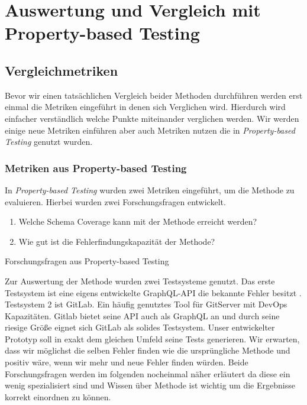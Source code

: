 \chapter{Auswertung und Vergleich mit Property-based Testing}
\label{experimente}

\section{Vergleichmetriken}
Bevor wir einen tatsächlichen Vergleich beider Methoden durchführen werden erst einmal die Metriken eingeführt in denen
sich Verglichen wird.
Hierdurch wird einfacher verständlich welche Punkte miteinander verglichen werden.
Wir werden einige neue Metriken einführen aber auch Metriken nutzen die in \textit{Property-based Testing}\cite{property-based-testing} genutzt wurden.

\subsection{Metriken aus Property-based Testing}

In \textit{Property-based Testing} wurden zwei Metriken eingeführt, um die Methode zu evaluieren.
Hierbei wurden zwei Forschungsfragen entwickelt.

\begin{enumerate}
    \item Welche Schema Coverage kann mit der Methode erreicht werden? \cite[vgl. RQ1]{property-based-testing}
    \item Wie gut ist die Fehlerfindungskapazität der Methode? \cite[vgl. RG2]{property-based-testing}
\end{enumerate}
\caption{Forschungsfragen aus Property-based Testing}

Zur Auswertung der Methode wurden zwei Testsysteme genutzt.
Das erste Testsystem ist eine eigens entwickelte GraphQL-API die bekannte Fehler besitzt \cite[vgl. A.1]{property-based-testing}.
Testsystem 2 ist GitLab.
Ein häufig genutztes Tool für GitServer mit DevOps Kapazitäten.
Gitlab bietet seine API auch als GraphQL an und durch seine riesige Größe eignet sich GitLab als solides Testsystem. \cite[vgl. A2]{property-based-testing}
Unser entwickelter Prototyp soll in exakt dem gleichen Umfeld seine Tests generieren.
Wir erwarten, dass wir möglichst die selben Fehler finden wie die ursprüngliche Methode und positiv wäre, wenn wir mehr und neue Fehler finden würden.
Beide Forschungsfragen werden im folgenden nocheinmal näher erläutert da diese ein wenig spezialisiert sind und Wissen über Methode
ist wichtig um die Ergebnisse korrekt einordnen zu können.

